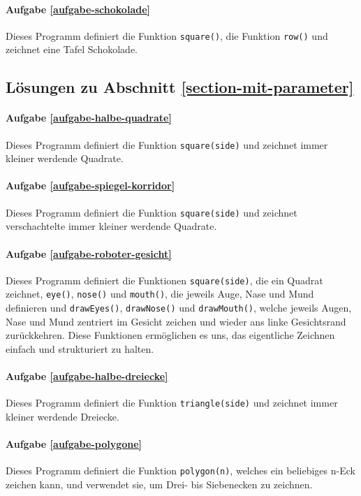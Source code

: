 \documentclass{article}
\begin{document}
\paragraph{Aufgabe \ref{aufgabe-schokolade}} 
Dieses Programm definiert die Funktion \lstinline|square()|, die Funktion \lstinline|row()| und zeichnet eine Tafel Schokolade.


\subsection*{Lösungen zu Abschnitt \ref{section-mit-parameter}}

\paragraph{Aufgabe \ref{aufgabe-halbe-quadrate}}
Dieses Programm definiert die Funktion \lstinline|square(side)| und zeichnet immer kleiner werdende Quadrate.


\paragraph{Aufgabe \ref{aufgabe-spiegel-korridor}}
Dieses Programm definiert die Funktion \lstinline|square(side)| und zeichnet verschachtelte immer kleiner werdende Quadrate.


\paragraph{Aufgabe \ref{aufgabe-roboter-gesicht}} 
Dieses Programm definiert die Funktionen \lstinline|square(side)|, die ein Quadrat zeichnet, \lstinline|eye()|, \lstinline|nose()| und \lstinline|mouth()|, die jeweils Auge, Nase und Mund definieren und \lstinline|drawEyes()|, \lstinline|drawNose()| und \lstinline|drawMouth()|, welche jeweils Augen, Nase und Mund zentriert im Gesicht zeichen und wieder ans linke Gesichtsrand zurückkehren.
Diese Funktionen ermöglichen es uns, das eigentliche Zeichnen einfach und strukturiert zu halten.


\paragraph{Aufgabe \ref{aufgabe-halbe-dreiecke}}
Dieses Programm definiert die Funktion \lstinline|triangle(side)| und zeichnet immer kleiner werdende Dreiecke.


\paragraph{Aufgabe \ref{aufgabe-polygone}}
Dieses Programm definiert die Funktion \lstinline|polygon(n)|, welches ein beliebiges n-Eck zeichen kann, und verwendet sie, um Drei- bis Siebenecken zu zeichnen.

\end{document}
